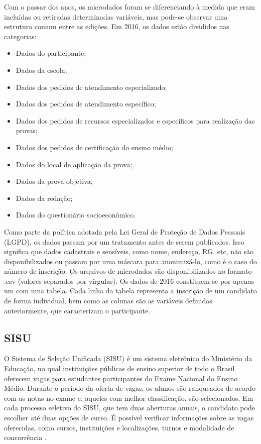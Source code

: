 Com o passar dos anos, os microdados foram se diferenciando à medida que eram incluídas ou retiradas determinadas variáveis, mas pode-se observar uma estrutura comum entre as edições. Em 2016, os dados estão divididos nas categorias:

\begin{itemize}
  \item Dados do participante; 
  \item Dados da escola;
  \item Dados dos pedidos de atendimento especializado;
  \item Dados dos pedidos de atendimento específico;
  \item Dados dos pedidos de recursos especializados e específicos para realização das provas;
  \item Dados dos pedidos de certificação do ensino médio;
  \item Dados do local de aplicação da prova;
  \item Dados da prova objetiva;
  \item Dados da redação;
  \item Dados do questionário socioeconômico.
\end{itemize}

Como parte da política adotada pela Lei Geral de Proteção de Dados Pessoais (LGPD), os dados passam por um tratamento antes de serem publicados. Isso significa que dados cadastrais e sensíveis, como nome, endereço, RG, etc, não são disponibilizados ou passam por uma máscara para anonimizá-lo, como é o caso do número de inscrição. Os arquivos de microdados são disponibilizados no formato .csv (valores separados por vírgulas). Os dados de 2016 constituem-se por apenas um  com uma tabela. Cada linha da tabela representa a inscrição de um candidato de forma individual, bem como as colunas são as variáveis definidas anteriormente, que caracterizam o participante. 

\subsection{SISU}
O Sistema de Seleção Unificada (SISU) é um sistema eletrônico do Ministério da Educação, no qual instituições públicas de ensino superior de todo o Brasil oferecem vagas para estudantes participantes do Exame Nacional do Ensino Médio. Durante o período da oferta de vagas, os alunos são ranqueados de acordo com as notas no exame e, aqueles com melhor classificação, são selecionados. Em cada processo seletivo do SISU, que tem duas aberturas anuais, o candidato pode escolher até duas opções de curso. É possível verificar informações sobre as vagas oferecidas, como cursos, instituições e localizações, turnos e modalidade de concorrência \autocite{mec:1}.

